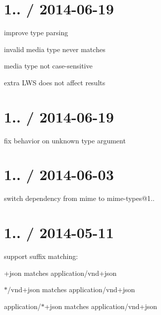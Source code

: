 \section*{1.. / 2014-\/06-\/19 }


\begin{DoxyItemize}
\item improve type parsing
\begin{DoxyItemize}
\item invalid media type never matches
\item media type not case-\/sensitive
\item extra L\+W\+S does not affect results
\end{DoxyItemize}
\end{DoxyItemize}

\section*{1.. / 2014-\/06-\/19 }


\begin{DoxyItemize}
\item fix behavior on unknown type argument
\end{DoxyItemize}

\section*{1.. / 2014-\/06-\/03 }


\begin{DoxyItemize}
\item switch dependency from {\ttfamily mime} to {\ttfamily mime-\/types@1..}
\end{DoxyItemize}

\section*{1.. / 2014-\/05-\/11 }


\begin{DoxyItemize}
\item support suffix matching\+:
\begin{DoxyItemize}
\item {\ttfamily +json} matches {\ttfamily application/vnd+json}
\item {\ttfamily $\ast$/vnd+json} matches {\ttfamily application/vnd+json}
\item {\ttfamily application/$\ast$+json} matches {\ttfamily application/vnd+json}
\end{DoxyItemize}
\end{DoxyItemize}

